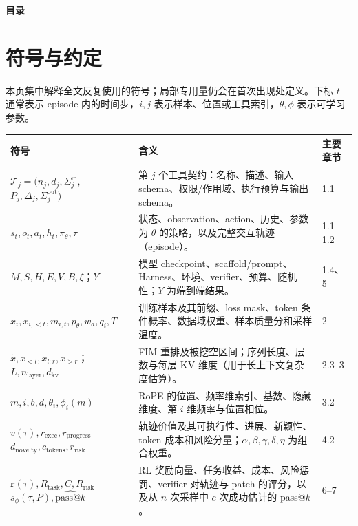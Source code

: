 \documentclass[10pt,a4paper,UTF8,fontset=none]{ctexart}
\renewcommand{\arraystretch}{1.18}
\begin{document}
\clearpage
\begingroup
\markboth{}{}
\fancyhead[R]{}
\begin{center}
  {\Large\bfseries\color{Navy} 目录}
\end{center}
\vspace{3pt}
{\footnotesize{}\setlength{\parskip}{0pt}\tableofcontents}

\clearpage
\endgroup

\section*{符号与约定}

本页集中解释全文反复使用的符号；局部专用量仍会在首次出现处定义。下标 $t$ 通常表示 episode 内的时间步，$i,j$ 表示样本、位置或工具索引，$\theta,\phi$ 表示可学习参数。

\begingroup
\small
\setlength{\tabcolsep}{4pt}
\renewcommand{\arraystretch}{1.12}
\noindent
\begin{tabularx}{\textwidth}{p{4.5cm}Yp{1.55cm}}
\toprule
\textbf{符号} & \textbf{含义} & \textbf{主要章节} \\
\midrule
{}
& 第 $j$ 个工具契约：名称、描述、输入 schema、权限/作用域、执行预算与输出 schema。 & 1.1 \\
$s_t,o_t,a_t,h_t,\pi_\theta,\tau$
& 状态、observation、action、历史、参数为 $\theta$ 的策略，以及完整交互轨迹（episode）。 & 1.1--1.2 \\
$M,S,H,E,V,B,\xi$；$Y$
& 模型 checkpoint、scaffold/prompt、Harness、环境、verifier、预算、随机性；$Y$ 为端到端结果。 & 1.4、5 \\
$x_i,x_{i,<t},m_{i,t},p_\theta,w_d,q_i,T$
& 训练样本及其前缀、loss mask、token 条件概率、数据域权重、样本质量分和采样温度。 & 2 \\
$\tilde{x},x_{<l},x_{l:r},x_{>r}$；$L,n_{\mathrm{layer}},d_{\mathrm{kv}}$
& FIM 重排及被挖空区间；序列长度、层数与每层 KV 维度（用于长上下文复杂度估算）。 & 2.3--3 \\
$m,i,b,d,\theta_i,\phi_i(m)$
& RoPE 的位置、频率维索引、基数、隐藏维度、第 $i$ 维频率与位置相位。 & 3.2 \\
& 轨迹价值及其可执行性、进展、新颖性、token 成本和风险分量；$\alpha,\beta,\gamma,\delta,\eta$ 为组合权重。 & 4.2 \\
& RL 奖励向量、任务收益、成本、风险惩罚、verifier 对轨迹与 patch 的评分，以及从 $n$ 次采样中 $c$ 次成功估计的 pass@$k$。 & 6--7 \\
\bottomrule
\end{tabularx}
\endgroup
\end{document}
